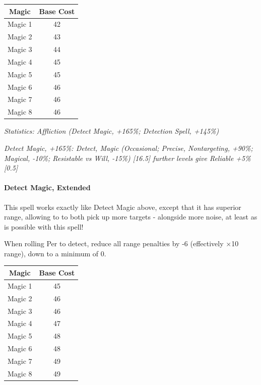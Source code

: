 \begin{multicols*}{3}
	\begin{center}
		\begin{tabular}{|c|c|}
			\hline
			Magic & Base Cost \\
			\hline
			\hline
			Magic 1 & 42 \\
			Magic 2 & 43 \\
			Magic 3 & 44 \\
			Magic 4 & 45 \\
			Magic 5 & 45 \\
			Magic 6 & 46 \\
			Magic 7 & 46 \\
			Magic 8 & 46 \\
			\hline
		\end{tabular}
	\end{center} 
	
	\textcolor{OliveGreen}{\textit{ Statistics: Affliction (Detect Magic, +165\%; Detection Spell, +145\%) }}
	
	\textcolor{OliveGreen}{\textit{Detect Magic, +165\%: Detect, Magic (Occasional; Precise, Nontargeting, +90\%; Magical, -10\%; Resistable vs Will, -15\%) [16.5] further levels give Reliable +5\% [0.5]}}
	
	\paragraph{Detect Magic, Extended}
	
	This spell works exactly like Detect Magic above, except that it has superior range, allowing to to both pick up more targets - alongside more noise, at least as is possible with this spell!
	
	When rolling Per to detect, reduce all range penalties by -6 (effectively $\times$10 range), down to a minimum of 0.
	
	\begin{center}
		\begin{tabular}{|c|c|}
			\hline
			Magic & Base Cost \\
			\hline
			\hline
			Magic 1 & 45 \\
			Magic 2 & 46 \\
			Magic 3 & 46 \\
			Magic 4 & 47 \\
			Magic 5 & 48 \\
			Magic 6 & 48 \\
			Magic 7 & 49 \\
			Magic 8 & 49 \\
			\hline
		\end{tabular}
	\end{center} 
	

\end{multicols*}
